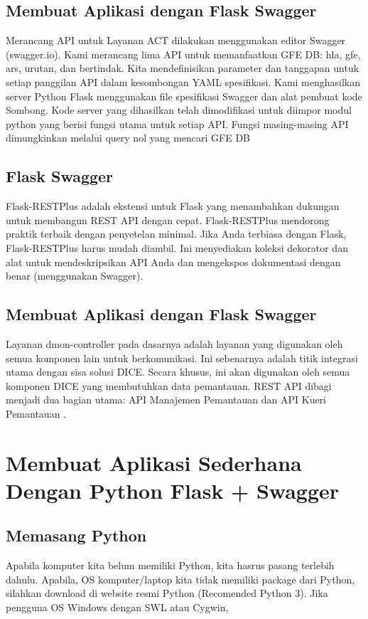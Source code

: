 \subsection{Membuat Aplikasi dengan Flask Swagger}
Merancang API untuk Layanan ACT dilakukan menggunakan editor Swagger (swagger.io).
Kami merancang lima API untuk memanfaatkan GFE DB: hla, gfe, ars, urutan, dan bertindak. Kita
mendefinisikan parameter dan tanggapan untuk setiap panggilan API dalam kesombongan YAML
spesifikasi. Kami menghasilkan server Python Flask menggunakan file spesifikasi Swagger
dan alat pembuat kode Sombong. Kode server yang dihasilkan telah dimodifikasi untuk diimpor
modul python yang berisi fungsi utama untuk setiap API. Fungsi masing-masing
API dimungkinkan melalui query nol yang mencari GFE DB \cite{halagan2017bioinformatics}

\subsection{Flask Swagger}
Flask-RESTPlus adalah ekstensi untuk Flask yang menambahkan dukungan untuk membangun REST API dengan cepat. Flask-RESTPlus mendorong praktik terbaik dengan penyetelan minimal. Jika Anda terbiasa dengan Flask, Flask-RESTPlus harus mudah diambil. Ini menyediakan koleksi dekorator dan alat untuk mendeskripsikan API Anda dan mengekspos dokumentasi dengan benar (menggunakan Swagger)\cite{buhler2017design}.

\subsection{Membuat Aplikasi dengan Flask Swagger}
Layanan dmon-controller pada dasarnya adalah layanan yang digunakan oleh semua komponen lain untuk berkomunikasi. Ini sebenarnya adalah titik integrasi utama dengan sisa solusi DICE. Secara khusus, ini akan digunakan oleh semua komponen DICE yang membutuhkan data pemantauan. REST API dibagi menjadi dua bagian utama: API Manajemen Pemantauan dan API Kueri Pemantauan \cite{pop2016monitoring}.

\section{Membuat Aplikasi Sederhana Dengan Python Flask + Swagger}

\subsection{Memasang Python}
Apabila komputer kita belum memiliki Python, kita hasrus pasang terlebih dahulu. Apabila, OS komputer/laptop kita tidak memiliki package dari Python, silahkan download di website resmi Python (Recomended Python 3). Jika pengguna OS Windows dengan SWL atau Cygwin,

